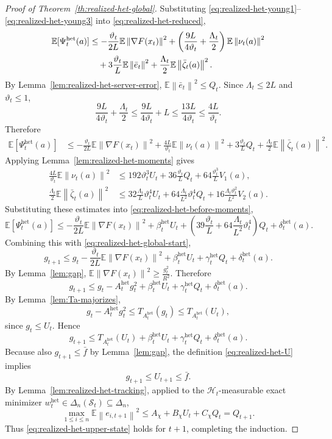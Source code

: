 \documentclass{article}
\theoremstyle{definition}
\newcommand{\EE}{\mathbb E}
\newcommand{\norm}[1]{\left\lVert #1\right\rVert}
\begin{document}
\begin{proof}[Proof of Theorem~\ref{th:realized-het-global}]
Substituting \eqref{eq:realized-het-young1}--\eqref{eq:realized-het-young3} into
\eqref{eq:realized-het-reduced},
\begin{align*}
\EE[\Psi_t^{\mathrm{het}}(a)]
&\le
-\frac{\vartheta_t}{2L}\EE\norm{\nabla F(x_t)}^2
+
\left(
\frac{9L}{4\vartheta_t}
+
\frac{\Lambda_t}{2}
\right)\EE\norm{\nu_t(a)}^2
\notag\\
&\quad+
3\frac{\vartheta_t}{L}\EE\norm{\bar e_t}^2
+
\frac{\Lambda_t}{2}\EE\norm{\bar\zeta_t(a)}^2.
\end{align*}
By Lemma~\ref{lem:realized-het-server-error}, $\EE\norm{\bar e_t}^2\le Q_t$.
Since $\Lambda_t\le 2L$ and $\vartheta_t\le 1$,
\[
\frac{9L}{4\vartheta_t}+\frac{\Lambda_t}{2}
\le
\frac{9L}{4\vartheta_t}+L
\le
\frac{13L}{4\vartheta_t}
\le
\frac{4L}{\vartheta_t}.
\]
Therefore
\begin{align}
\EE[\Psi_t^{\mathrm{het}}(a)]
&\le
-\frac{\vartheta_t}{2L}\EE\norm{\nabla F(x_t)}^2
+
\frac{4L}{\vartheta_t}\EE\norm{\nu_t(a)}^2
+
3\frac{\vartheta_t}{L}Q_t
+
\frac{\Lambda_t}{2}\EE\norm{\bar\zeta_t(a)}^2.
\label{eq:realized-het-before-moments}
\end{align}
Applying Lemma~\ref{lem:realized-het-moments} gives
\begin{align*}
\frac{4L}{\vartheta_t}\EE\norm{\nu_t(a)}^2
&\le
192\vartheta_t^3 U_t
+
36\frac{\vartheta_t}{L}Q_t
+
64\frac{\vartheta_t^3}{L}V_1(a),
\\
\frac{\Lambda_t}{2}\EE\norm{\bar\zeta_t(a)}^2
&\le
32\frac{\Lambda_t}{L}\vartheta_t^4 U_t
+
64\frac{\Lambda_t}{L^2}\vartheta_t^4 Q_t
+
16\frac{\Lambda_t\vartheta_t^2}{L^2}V_2(a).
\end{align*}
Substituting these estimates into \eqref{eq:realized-het-before-moments},
\[
\EE[\Psi_t^{\mathrm{het}}(a)]
\le
-\frac{\vartheta_t}{2L}\EE\norm{\nabla F(x_t)}^2
+
\beta_t^{\mathrm{het}}U_t
+
\left(
39\frac{\vartheta_t}{L}
+
64\frac{\Lambda_t}{L^2}\vartheta_t^4
\right)Q_t
+
\delta_t^{\mathrm{het}}(a).
\]
Combining this with \eqref{eq:realized-het-global-start},
\[
g_{t+1}
\le
g_t
-
\frac{\vartheta_t}{2L}\EE\norm{\nabla F(x_t)}^2
+
\beta_t^{\mathrm{het}}U_t
+
\gamma_t^{\mathrm{het}}Q_t
+
\delta_t^{\mathrm{het}}(a).
\]
By Lemma~\ref{lem:gap}, $\EE\norm{\nabla F(x_t)}^2\ge \frac{g_t^2}{R^2}$.
Therefore
\[
g_{t+1}
\le
g_t-A_t^{\mathrm{het}}g_t^2+\beta_t^{\mathrm{het}}U_t+\gamma_t^{\mathrm{het}}Q_t+\delta_t^{\mathrm{het}}(a).
\]
By Lemma~\ref{lem:Ta-majorizes},
\[
g_t-A_t^{\mathrm{het}}g_t^2
\le
T_{A_t^{\mathrm{het}}}(g_t)
\le
T_{A_t^{\mathrm{het}}}(U_t),
\]
since $g_t\le U_t$. Hence
\[
g_{t+1}
\le
T_{A_t^{\mathrm{het}}}(U_t)
+
\beta_t^{\mathrm{het}}U_t
+
\gamma_t^{\mathrm{het}}Q_t
+
\delta_t^{\mathrm{het}}(a).
\]
Because also $g_{t+1}\le \bar f$ by Lemma~\ref{lem:gap}, the definition \eqref{eq:realized-het-U}
implies
\[
g_{t+1}\le U_{t+1}\le \bar f.
\]
By Lemma~\ref{lem:realized-het-tracking}, applied to the $\mathcal H_t$-measurable exact minimizer
$w_t^{\mathrm{het}}\in\Delta_n(\mathcal S_t)\subseteq\Delta_n$,
\[
\max_{1\le i\le n}\EE\norm{e_{i,t+1}}^2
\le
A_\chi+B_\chi U_t+C_\chi Q_t
=
Q_{t+1}.
\]
Thus \eqref{eq:realized-het-upper-state} holds for $t+1$, completing the induction.
\end{proof}
\end{document}

